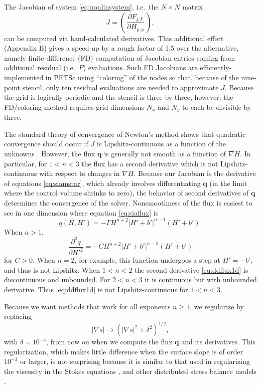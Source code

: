 \documentclass[twocolumn,letterpaper]{igs}
\newcommand\bq{\mathbf{q}}
\newcommand{\grad}{\nabla}
\begin{document}
The Jacobian of system \eqref{eq:nonlinsystem}, i.e.~the $N\times N$ matrix
\begin{equation}
J = \left(\,\frac{\partial F_{j,k}}{\partial H_{p,q}}\,\right), \label{eq:nonlinjacobian}
\end{equation}
can be computed via hand-calculated derivatives.  This additional effort (Appendix B) gives a speed-up by a rough factor of 1.5 over the alternative, namely finite-difference (FD) computation of Jacobian entries coming from additional residual (i.e.~$F$) evaluations.  Such FD Jacobians are efficiently-implemented in PETSc using ``coloring'' of the nodes \citep{CurtisPowellReid1974} so that, because of the nine-point stencil, only ten residual evaluations are needed to approximate $J$.  Because the grid is logically periodic and the stencil is three-by-three, however, the FD/coloring method requires grid dimensions $N_x$ and $N_y$ to each be divisible by three.

The standard theory of convergence of Newton's method shows that quadratic convergence should occur if $J$ is Lipshitz-continuous as a function of the unknowns \citep[and references therein]{Kelley2003}.  However, the flux $\bq$ is generally not smooth as a function of $\grad H$.  In particular, for $1<n<3$ the flux has a second derivative which is not Lipshitz-continuous with respect to changes in $\grad H$.  Because our Jacobian is the derivative of equations \eqref{eq:siamstar}, which already involves differentiating $\bq$ (in the limit where the control volume shrinks to zero), the behavior of second derivatives of $\bq$ determines the convergence of the solver.  Nonsmoothness of the flux is easiest to see in one dimension where equation \eqref{eq:siaflux} is
\begin{equation}
q(H,H') = - \Gamma H^{n+2} \left|H'+b'\right|^{n-1} (H'+b'). \label{eq:flux1d}
\end{equation}
When $n>1$,
\begin{equation}
\frac{\partial^2 q}{\partial H'^2} = - C H^{n+2} \left|H'+b'\right|^{n-3} (H'+b') \label{eq:ddflux1d}
\end{equation}
for $C>0$.  When $n=2$, for example, this function undergoes a step at $H'=-b'$, and thus is not Lipshitz.  When $1< n < 2$ the second derivative \eqref{eq:ddflux1d} is discontinuous and unbounded.  For $2<n<3$ it is continuous but with unbounded derivative.  Thus \eqref{eq:ddflux1d} is not Lipshitz-continuous for $1<n<3$.

Because we want methods that work for all exponents $n\ge 1$, we regularize by replacing
\begin{equation}
|\grad s| \to \left(|\grad s|^2 + \delta^2\right)^{1/2}, \label{eq:nonlinregularization}
\end{equation}
with $\delta = 10^{-4}$, from now on when we compute the flux $\bq$ and its derivatives.  This regularization, which makes little difference when the surface slope is of order $10^{-3}$ or larger, is not surprising because it is similar to that used in regularizing the viscosity in the Stokes equations \citep{GreveBlatter2009}, and other distributed stress balance models \citep[for example]{BrownSmithAhmadia2013,BuelerBrown2009}.
\end{document}

